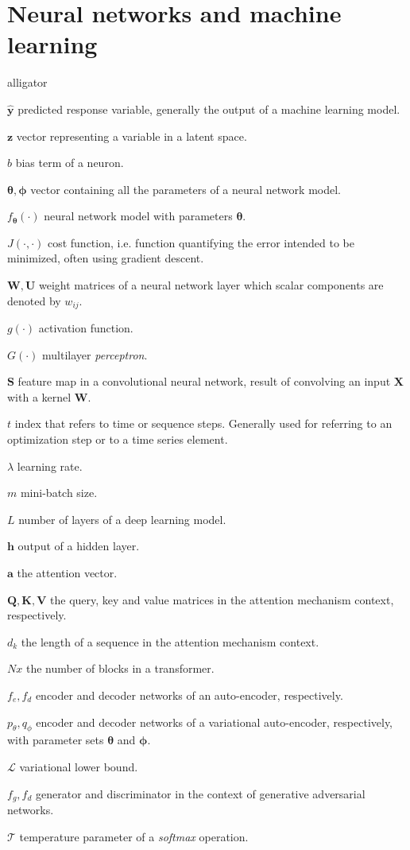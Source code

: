 \section*{Neural networks and machine learning}

\begin{labeling}{alligator}
	\item [$\mathbf{\hat{y}}$] predicted response variable, generally the output of a machine learning model.
	\item [$\mathbf{z}$] vector representing a variable in a latent space.
	\item [$b$] bias term of a neuron.
	\item [$\mathbf{\theta}, \mathbf{\phi}$] vector containing all the parameters of a neural network model.
	\item [$f_\mathbf{\theta}(\cdot)$] neural network model with parameters $\mathbf{\theta}$.
	\item [$J(\cdot, \cdot)$] cost function, i.e. function quantifying the error intended to be minimized, often using gradient descent.
	\item [$\mathbf{W}, \mathbf{U}$] weight matrices of a neural network layer which scalar components are denoted by $w_{ij}$.
	\item[$g(\cdot)$] activation function.
	\item[$G(\cdot)$] multilayer \textit{perceptron}.
	\item[$\mathbf{S}$] feature map in a convolutional neural network, result of convolving an input $\mathbf{X}$ with a kernel $\mathbf{W}$.
	\item[$t$] index that refers to time or sequence steps. Generally used for referring to  an optimization step or to a time series element.
	\item[$\lambda$] learning rate.
	\item[$m$] mini-batch size.
	\item[$L$] number of layers of a deep learning model.
	\item[$\mathbf{h}$] output of a hidden layer.
	\item[$\mathbf{a}$] the attention vector.
	\item[$\mathbf{Q}, \mathbf{K}, \mathbf{V}$] the query, key and value matrices in the attention mechanism context, respectively.
	\item[$d_k$]{the length of a sequence in the attention mechanism context.}
	\item[$Nx$]{the number of blocks in a transformer.}
	\item[$f_e, f_d$]{encoder and decoder networks of an auto-encoder, respectively.}
	\item[$p_\theta, q_\phi$]{encoder and decoder networks of a variational auto-encoder, respectively, with parameter sets $\mathbf{\theta}$ and $\mathbf{\phi}$.}
	\item[$\mathcal{L}$]{variational lower bound.}
	\item[$f_g, f_d$]{generator and discriminator in the context of generative adversarial networks.}
	\item[$\mathcal{T}$] temperature parameter of a \textit{softmax} operation.
\end{labeling}


